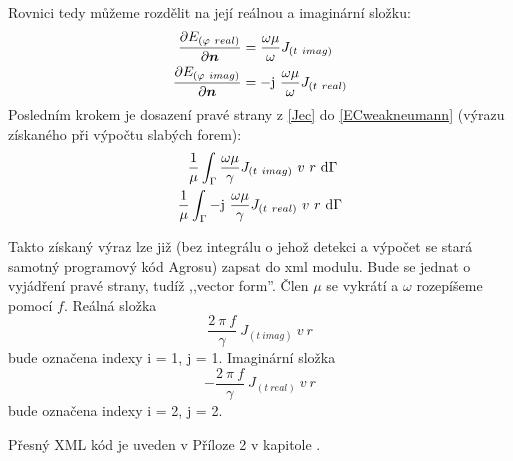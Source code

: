 \documentclass[12pt,a4paper,oneside]{article}
\numberwithin{equation}{section} %
\numberwithin{figure}{section} %
\numberwithin{table}{section} %
\newcommand{\mj}{\mathrm{j}} %
\renewcommand{\vec}[1]{\mbox{\boldmath$#1$}} %
\begin{document}
Rovnici tedy můžeme rozdělit na její reálnou a imaginární složku:
\begin{subequations}
\label{Jec}
\begin{align}
\frac{\partial E _{(\varphi ~real)}}{\partial \vec{n}} &= \frac{\omega \mu}{\omega}  J _{(t~imag)}
\\
\frac{\partial E _{(\varphi ~imag)}}{\partial \vec{n}} &= - \mj ~ \frac{\omega \mu}{\omega} J _{(t~real)}
\end{align}
\end{subequations}
Posledním krokem je dosazení pravé strany z \ref{Jec} do \ref{ECweakneumann} (výrazu získaného při výpočtu slabých forem):
\begin{subequations}
\begin{align}
\frac{1}{\mu} \int _{\Gamma} \frac{\omega \mu}{\gamma} J _{(t~imag)} ~ v ~ r ~ \ud \Gamma ~
\\
\frac{1}{\mu} \int _{\Gamma} - \mj ~ \frac{\omega \mu}{\gamma} J _{(t~real)} ~ v ~ r ~ \ud \Gamma
\end{align}
\end{subequations}

Takto získaný výraz lze již (bez integrálu o jehož detekci a výpočet se stará samotný programový kód Agrosu) zapsat do xml modulu. Bude se jednat o vyjádření pravé strany, tudíž ,,vector form''. Člen $\mu$ se vykrátí a $\omega$ rozepíšeme pomocí $f$. Reálná složka  
\begin{equation}
\frac{2 ~ \pi ~ f}{\gamma} ~ J_{(t~imag)} ~ v ~ r
\end{equation} 
bude označena indexy i = 1, j = 1. Imaginární složka 
\begin{equation}
- \frac{2 ~ \pi ~ f}{\gamma} ~ J_{(t~real)} ~ v ~ r
\end{equation}
bude označena indexy i = 2, j = 2.

Přesný XML kód je uveden v Příloze 2 v kapitole .
\end{document}

